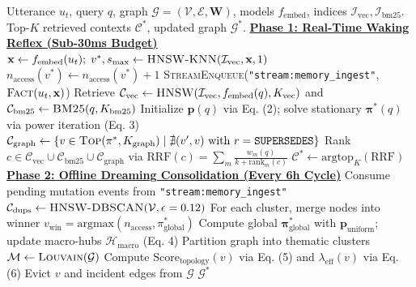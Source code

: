 \documentclass[conference]{IEEEtran}
\begin{document}
\begin{algorithm}[t]
\caption{EngramRAG Dual-Brain Lifecycle}
\label{alg:engramrag_lifecycle}
\footnotesize
\begin{algorithmic}[1]
\Require Utterance $u_t$, query $q$, graph $\mathcal{G} = (\mathcal{V}, \mathcal{E}, \mathbf{W})$, models $f_{\text{embed}}$, indices $\mathcal{I}_{\text{vec}}, \mathcal{I}_{\text{bm25}}$.
\Ensure Top-$K$ retrieved contexts $\mathcal{C}^*$, updated graph $\mathcal{G}^*$.
\Statex \textbf{\underline{Phase 1: Real-Time Waking Reflex (Sub-30ms Budget)}}
    \State $\mathbf{x} \gets f_{\text{embed}}(u_t); \; v^*, s_{\max} \gets \textsc{HNSW-KNN}(\mathcal{I}_{\text{vec}}, \mathbf{x}, 1)$
     $n_{\text{access}}(v^*) \gets n_{\text{access}}(v^*) + 1$ 
    \Else \; \textsc{StreamEnqueue}(\texttt{"stream:memory\_ingest"}, $\textsc{Fact}(u_t, \mathbf{x})$)
    \EndIf
    \State Retrieve $\mathcal{C}_{\text{vec}} \gets \textsc{HNSW}(\mathcal{I}_{\text{vec}}, f_{\text{embed}}(q), K_{\text{vec}})$ and $\mathcal{C}_{\text{bm25}} \gets \textsc{BM25}(q, K_{\text{bm25}})$
    \State Initialize $\mathbf{p}(q)$ via Eq. (2); solve stationary $\mathbf{\pi}^*(q)$ via power iteration (Eq. 3)
    \State $\mathcal{C}_{\text{graph}} \gets \{v \in \textsc{Top}(\mathbf{\pi}^*, K_{\text{graph}}) \mid \nexists (v', v) \text{ with } r = \texttt{SUPERSEDES}\}$
    \State Rank $c \in \mathcal{C}_{\text{vec}} \cup \mathcal{C}_{\text{bm25}} \cup \mathcal{C}_{\text{graph}}$ via $\text{RRF}(c) = \sum_{m} \frac{w_m(q)}{k + \text{rank}_m(c)}$
    \State \Return $\mathcal{C}^* \gets \text{argtop}_K(\text{RRF})$
\EndProcedure
\Statex \textbf{\underline{Phase 2: Offline Dreaming Consolidation (Every 6h Cycle)}}
    \State Consume pending mutation events from \texttt{"stream:memory\_ingest"}
    \State $\mathcal{C}_{\text{dups}} \gets \textsc{HNSW-DBSCAN}(\mathcal{V}, \epsilon=0.12)$ 
    \State For each cluster, merge nodes into winner $v_{\text{win}} = \text{argmax}(n_{\text{access}}, \pi_{\text{global}}^*)$
    \State Compute global $\mathbf{\pi}_{\text{global}}^*$ with $\mathbf{p}_{\text{uniform}}$; update macro-hubs $\mathcal{H}_{\text{macro}}$ (Eq. 4)
    \State Partition graph into thematic clusters $\mathcal{M} \gets \textsc{Louvain}(\mathcal{G})$ 
     
        \State Compute $\text{Score}_{\text{topology}}(v)$ via Eq. (5) and $\lambda_{\text{eff}}(v)$ via Eq. (6)
            \State Evict $v$ and incident edges from $\mathcal{G}$
        \EndIf
    \EndFor
    \State \Return $\mathcal{G}^*$
\EndProcedure
\end{algorithmic}
\end{algorithm}
\end{document}
